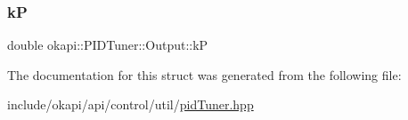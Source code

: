 \mbox{\label{structokapi_1_1PIDTuner_1_1Output_ac692f4d0b2eac40a7666718d484c172a}} 
\subsubsection{\texorpdfstring{kP}{kP}}
{\footnotesize\ttfamily double okapi\+::\+P\+I\+D\+Tuner\+::\+Output\+::kP}



The documentation for this struct was generated from the following file\+:\begin{DoxyCompactItemize}
\item 
include/okapi/api/control/util/\mbox{\hyperlink{pidTuner_8hpp}{pid\+Tuner.\+hpp}}\end{DoxyCompactItemize}
